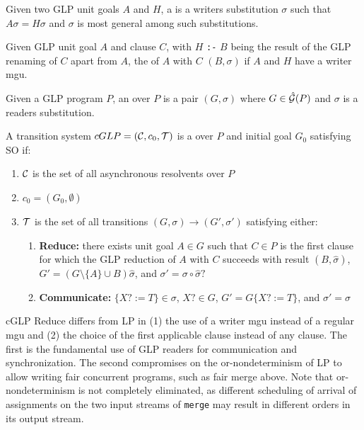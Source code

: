 \begin{definition}
\label{def:writer-mgu}
Given two GLP unit goals $A$ and $H$, a  is a writers substitution $\sigma$ such that $A\sigma = H\sigma$ and $\sigma$ is most general among such substitutions. 
\end{definition}

\begin{definition}
\label{def:glp-reduction}
Given GLP unit goal $A$ and clause $C$, with $H$ \verb|:-| $B$ being the result of the GLP renaming of $C$ apart from $A$, the  of $A$ with $C$  $(B,\sigma)$ if $A$ and $H$ have a writer mgu.
\end{definition}

\begin{definition}
\label{def:cglp-ts}
Given a GLP program $P$, an  over $P$ is a pair $(G, \sigma)$ where $G \in \hat{\mathcal{G}}(P)$ and $\sigma$ is a readers substitution.

A transition system $cGLP = (\mathcal{C}, c_0, \mathcal{T})$ is a  over $P$ and initial goal $G_0$ satisfying SO if:
\begin{enumerate}
    \item $\mathcal{C}$ is the set of all asynchronous resolvents over $P$
    \item $c_0 = (G_0, \emptyset)$
    \item $\mathcal{T}$ is the set of all transitions $(G, \sigma) \rightarrow (G', \sigma')$ satisfying either:
    \begin{enumerate}
        \item \textbf{Reduce:} there exists unit goal $A \in G$ such that $C \in P$ is the first clause for which the GLP reduction of $A$ with $C$ succeeds with result $(B, \hat\sigma)$, $G' = (G \setminus \{A\} \cup B)\hat\sigma$, and $\sigma' = \sigma \circ \hat\sigma?$
        \item \textbf{Communicate:} $\{X? := T\} \in \sigma$, $X?\in G$, $G' = G\{X? := T\}$, and $\sigma' = \sigma$
    \end{enumerate}
\end{enumerate}
\end{definition}

cGLP Reduce differs from LP in (1) the use of a writer mgu instead of a regular mgu and (2) the choice of the first applicable clause instead of any clause. The first is the fundamental use of GLP readers for communication and synchronization. The second compromises on the or-nondeterminism of LP to allow writing fair concurrent programs, such as fair merge above. Note that or-nondeterminism is not completely eliminated, as different scheduling of arrival of assignments on the two input streams of \verb|merge| may result in different orders in its output stream.

